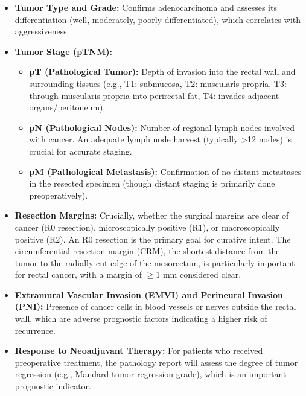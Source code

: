 \begin{itemize}
  \item \textbf{Tumor Type and Grade:} Confirms adenocarcinoma and assesses its differentiation (well, moderately, poorly differentiated), which correlates with aggressiveness.
  
  \item \textbf{Tumor Stage (pTNM):}
    \begin{itemize}
      \item \textbf{pT (Pathological Tumor):} Depth of invasion into the rectal wall and surrounding tissues (e.g., T1: submucosa, T2: muscularis propria, T3: through muscularis propria into perirectal fat, T4: invades adjacent organs/peritoneum).
      
      \item \textbf{pN (Pathological Nodes):} Number of regional lymph nodes involved with cancer. An adequate lymph node harvest (typically >12 nodes) is crucial for accurate staging.
      
      \item \textbf{pM (Pathological Metastasis):} Confirmation of no distant metastases in the resected specimen (though distant staging is primarily done preoperatively).
    \end{itemize}
  
  \item \textbf{Resection Margins:} Crucially, whether the surgical margins are clear of cancer (R0 resection), microscopically positive (R1), or macroscopically positive (R2). An R0 resection is the primary goal for curative intent. The circumferential resection margin (CRM), the shortest distance from the tumor to the radially cut edge of the mesorectum, is particularly important for rectal cancer, with a margin of $\geq$1 mm considered clear.
  
  \item \textbf{Extramural Vascular Invasion (EMVI) and Perineural Invasion (PNI):} Presence of cancer cells in blood vessels or nerves outside the rectal wall, which are adverse prognostic factors indicating a higher risk of recurrence.
  
  \item \textbf{Response to Neoadjuvant Therapy:} For patients who received preoperative treatment, the pathology report will assess the degree of tumor regression (e.g., Mandard tumor regression grade), which is an important prognostic indicator.
\end{itemize}

